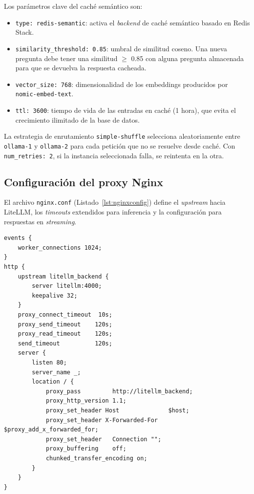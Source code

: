 Los parámetros clave del caché semántico son:

\begin{itemize}
    \item \texttt{type: redis-semantic}: activa el \textit{backend} de caché semántico basado en Redis Stack.
    \item \texttt{similarity\_threshold: 0.85}: umbral de similitud coseno. Una nueva pregunta debe tener una similitud $\ge$ 0.85 con alguna pregunta almacenada para que se devuelva la respuesta cacheada.
    \item \texttt{vector\_size: 768}: dimensionalidad de los embeddings producidos por \texttt{nomic-embed-text}.
    \item \texttt{ttl: 3600}: tiempo de vida de las entradas en caché (1 hora), que evita el crecimiento ilimitado de la base de datos.
\end{itemize}

La estrategia de enrutamiento \texttt{simple-shuffle} selecciona aleatoriamente entre \texttt{ollama-1} y \texttt{ollama-2} para cada petición que no se resuelve desde caché. Con \texttt{num\_retries: 2}, si la instancia seleccionada falla, se reintenta en la otra.

\subsection{Configuración del proxy Nginx}

El archivo \texttt{nginx.conf} (Listado~\ref{lst:nginxconfig}) define el \textit{upstream} hacia LiteLLM, los \textit{timeouts} extendidos para inferencia y la configuración para respuestas en \textit{streaming}.

\begin{lstlisting}[language=configure, caption=nginx.conf --- Configuración del proxy inverso, label=lst:nginxconfig]
events {
    worker_connections 1024;
}
http {
    upstream litellm_backend {
        server litellm:4000;
        keepalive 32;
    }
    proxy_connect_timeout  10s;
    proxy_send_timeout    120s;
    proxy_read_timeout    120s;
    send_timeout          120s;
    server {
        listen 80;
        server_name _;
        location / {
            proxy_pass         http://litellm_backend;
            proxy_http_version 1.1;
            proxy_set_header Host              $host;
            proxy_set_header X-Forwarded-For   $proxy_add_x_forwarded_for;
            proxy_set_header   Connection "";
            proxy_buffering    off;
            chunked_transfer_encoding on;
        }
    }
}
\end{lstlisting}

